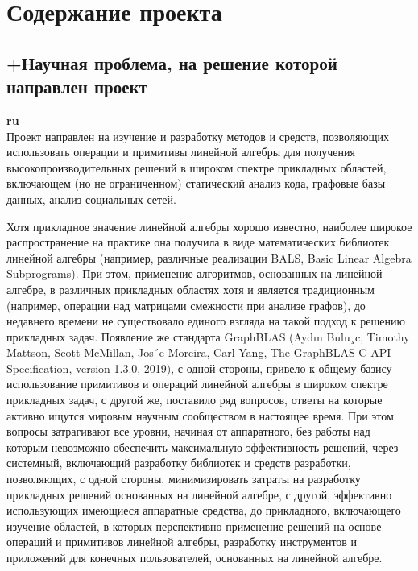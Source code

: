 \documentclass[12pt]{article}  %
\theoremstyle{remark}
\begin{document}
\section{Содержание проекта}

\subsection{+Научная проблема, на решение которой направлен проект}

\textbf{ru}\\

Проект направлен на изучение и разработку методов и средств, позволяющих использовать операции и примитивы линейной алгебры для получения высокопроизводительных решений в широком спектре прикладных областей, включающем (но не ограниченном) статический анализ кода, графовые базы данных, анализ социальных сетей.

Хотя прикладное значение линейной алгебры хорошо известно, наиболее широкое распространение на практике она получила в виде математических библиотек линейной алгебры (например, различные реализации BALS, Basic Linear Algebra Subprograms). При этом, применение алгоритмов, основанных на линейной алгебре, в различных прикладных областях хотя и является традиционным (например, операции над матрицами смежности при анализе графов), до недавнего времени не существовало единого взгляда на такой подход к решению прикладных задач. Появление же стандарта GraphBLAS (Aydın Bulu¸c, Timothy Mattson, Scott McMillan, Jos´e Moreira, Carl Yang, The GraphBLAS C API Specification, version 1.3.0, 2019), с одной стороны, привело к общему базису использование примитивов и операций линейной алгебры в широком спектре прикладных задач, с другой же, поставило ряд вопросов, ответы на которые активно ищутся мировым научным сообществом в настоящее время. При этом вопросы затрагивают все уровни, начиная от аппаратного, без работы над которым невозможно обеспечить максимальную эффективность решений, через системный, включающий разработку библиотек и средств разработки, позволяющих, с одной стороны, минимизировать затраты на разработку прикладных решений основанных на линейной алгебре, с другой, эффективно использующих имеющиеся аппаратные средства, до прикладного, включающего изучение областей, в которых перспективно применение решений на основе операций и примитивов линейной алгебры, разработку инструментов и приложений для конечных пользователей, основанных на линейной алгебре.
\end{document}
